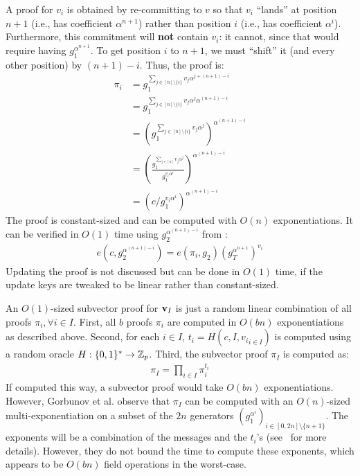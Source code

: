 A proof for $v_i$ is obtained by re-committing to $v$ so that $v_i$ ``lands'' at position $n+1$ (i.e., has coefficient $\alpha^{n+1}$) rather than position $i$ (i.e., has coefficient $\alpha^i$).
Furthermore, this commitment will \textbf{not} contain $v_i$: it cannot, since that would require having $g_1^{\alpha^{n+1}}$.
To get position $i$ to $n+1$, we must ``shift'' it (and every other position) by $(n + 1) - i$.
Thus, the proof is:
\begin{align}
\pi_i &= g_1^{\sum_{j\in[n]\setminus\{i\}} v_j \alpha^{j + (n+1) - i}}\\
      &= g_1^{\sum_{j\in[n]\setminus\{i\}} v_j \alpha^{j} \alpha^{(n+1) - i}}\\
      &= \left(g_1^{\sum_{j\in[n]\setminus\{i\}} v_j \alpha^{j}}\right)^{\alpha^{(n+1) - i}}\\
      &= \left(\frac{g_1^{\sum_{j\in[n]} v_j \alpha^{j}}}{g_1^{v_i \alpha^i}}\right)^{\alpha^{(n+1) - i}}\\
      &= (c / g_1^{v_i \alpha^i})^{\alpha^{(n+1) - i}}
\end{align}
The proof is constant-sized and can be computed with $O(n)$ exponentiations.
It can be verified in $O(1)$ time using $g_2^{\alpha^{(n+1) - i}}$ from \vrk:
\begin{align}
e(c, g_2^{\alpha^{(n+1)-i}})=e(\pi_i, g_2) \left(g_T^{\alpha^{n+1}}\right)^{v_i}
\end{align}
Updating the proof is not discussed but can be done in $O(1)$ time, if the update keys are tweaked to be linear rather than constant-sized.

An $O(1)$-sized subvector proof for $\bm{\mathrm{v}}_I$ is just a random linear combination of all proofs $\pi_i,\forall i\in I$.
First, all $b$ proofs $\pi_i$ are computed in $O(bn)$ exponentiations as described above.
Second, for each $i\in I$, $t_i = H(c, I, {v_i}_{i\in I})$ is computed using a random oracle $H : \{0,1\}^*\rightarrow \mathbb{Z}_p$.
Third, the subvector proof $\pi_I$ is computed as:
\begin{align}
\pi_I = \prod_{i\in I} \pi_i^{t_i}
\end{align}
If computed this way, a subvector proof would take $O(bn)$ exponentiations.
However, Gorbunov et al. observe that $\pi_I$ can be computed with an $O(n)$-sized multi-exponentiation on a subset of the $2n$ generators $(g_1^{\alpha^i})_{i\in[0,2n]\setminus \{n+1\}}$.
The exponents will be a combination of the messages and the $t_i$'s (see~\cite[Sec 4.1]{GRWZ20} for more details).
However, they do not bound the time to compute these exponents, which appears to be $O(bn)$ field operations in the worst-case.

